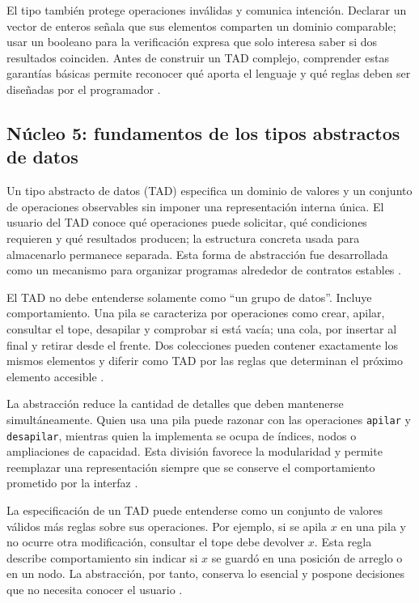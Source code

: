 \documentclass[12pt,letterpaper]{article}
\newcommand{\codigo}[1]{\texttt{#1}}
\begin{document}
El tipo también protege operaciones inválidas y comunica intención. Declarar un vector de enteros señala que sus elementos comparten un dominio comparable; usar un booleano para la verificación expresa que solo interesa saber si dos resultados coinciden. Antes de construir un TAD complejo, comprender estas garantías básicas permite reconocer qué aporta el lenguaje y qué reglas deben ser diseñadas por el programador \citep{wirth1976,goodrichcpp2011,sedgewick2011}.

\subsection{Núcleo 5: fundamentos de los tipos abstractos de datos}

Un tipo abstracto de datos (TAD) especifica un dominio de valores y un conjunto de operaciones observables sin imponer una representación interna única. El usuario del TAD conoce qué operaciones puede solicitar, qué condiciones requieren y qué resultados producen; la estructura concreta usada para almacenarlo permanece separada. Esta forma de abstracción fue desarrollada como un mecanismo para organizar programas alrededor de contratos estables \citep{liskov1974,zanabria2026,sedgewick2011}.

El TAD no debe entenderse solamente como ``un grupo de datos''. Incluye comportamiento. Una pila se caracteriza por operaciones como crear, apilar, consultar el tope, desapilar y comprobar si está vacía; una cola, por insertar al final y retirar desde el frente. Dos colecciones pueden contener exactamente los mismos elementos y diferir como TAD por las reglas que determinan el próximo elemento accesible \citep{sedgewick2011,goodrichpy2013,goodrichcpp2011}.

La abstracción reduce la cantidad de detalles que deben mantenerse simultáneamente. Quien usa una pila puede razonar con las operaciones \codigo{apilar} y \codigo{desapilar}, mientras quien la implementa se ocupa de índices, nodos o ampliaciones de capacidad. Esta división favorece la modularidad y permite reemplazar una representación siempre que se conserve el comportamiento prometido por la interfaz \citep{liskov1974,sedgewick2011,skiena2020}.

La especificación de un TAD puede entenderse como un conjunto de valores válidos más reglas sobre sus operaciones. Por ejemplo, si se apila $x$ en una pila y no ocurre otra modificación, consultar el tope debe devolver $x$. Esta regla describe comportamiento sin indicar si $x$ se guardó en una posición de arreglo o en un nodo. La abstracción, por tanto, conserva lo esencial y pospone decisiones que no necesita conocer el usuario \citep{liskov1974,wirth1976,goodrichpy2013}.
\end{document}
